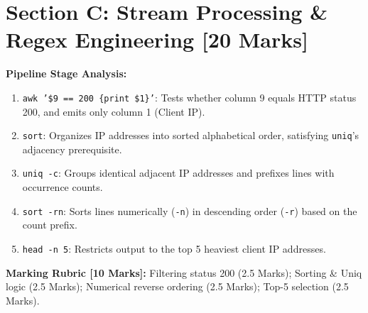 \section*{Section C: Stream Processing \& Regex Engineering [20 Marks]}


\begin{examsol}
\textbf{Pipeline Stage Analysis:}
\begin{enumerate}[leftmargin=1.5em]
    \item \texttt{awk '\$9 == 200 \{print \$1\}'}: Tests whether column 9 equals HTTP status 200, and emits only column 1 (Client IP).
    \item \texttt{sort}: Organizes IP addresses into sorted alphabetical order, satisfying \texttt{uniq}'s adjacency prerequisite.
    \item \texttt{uniq -c}: Groups identical adjacent IP addresses and prefixes lines with occurrence counts.
    \item \texttt{sort -rn}: Sorts lines numerically (\texttt{-n}) in descending order (\texttt{-r}) based on the count prefix.
    \item \texttt{head -n 5}: Restricts output to the top 5 heaviest client IP addresses.
\end{enumerate}

\begin{markingrubric}
\textbf{Marking Rubric [10 Marks]:} Filtering status 200 (2.5 Marks); Sorting \& Uniq logic (2.5 Marks); Numerical reverse ordering (2.5 Marks); Top-5 selection (2.5 Marks).
\end{markingrubric}
\end{examsol}
